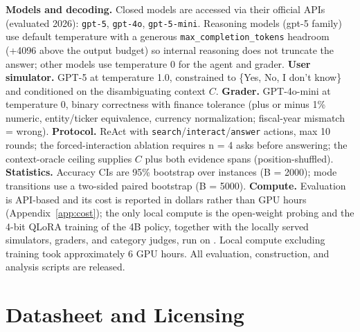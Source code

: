 \textbf{Models and decoding.} Closed models are accessed via their official APIs
(evaluated 2026): \texttt{gpt-5}, \texttt{gpt-4o}, \texttt{gpt-5-mini}. Reasoning
models (gpt-5 family) use default temperature with a generous
\texttt{max\_completion\_tokens} headroom (+4096 above the output budget) so
internal reasoning does not truncate the answer; other models use temperature
0 for the agent and grader. \textbf{User simulator.} GPT-5 at temperature 1.0,
constrained to \{Yes, No, I don't know\} and conditioned on the disambiguating
context $C$. \textbf{Grader.} GPT-4o-mini at temperature 0, binary correctness
with finance tolerance (plus or minus 1\% numeric, entity/ticker equivalence, currency
normalization; fiscal-year mismatch = wrong). \textbf{Protocol.} ReAct with
\texttt{search}/\texttt{interact}/\texttt{answer} actions, max 10 rounds; the
forced-interaction ablation requires n = 4 asks before answering; the
context-oracle ceiling supplies $C$ plus both evidence spans (position-shuffled).
\textbf{Statistics.} Accuracy CIs are 95\% bootstrap over instances (B = 2000);
mode transitions use a two-sided paired bootstrap (B = 5000).
\textbf{Compute.} Evaluation is API-based and its cost is reported in dollars rather than
GPU hours (Appendix~\ref{app:cost}); the only local compute is the open-weight probing and
the 4-bit QLoRA training of the 4B policy, together with the locally served simulators,
graders, and category judges, run on \GPUSPEC. Local compute excluding training took approximately 6 GPU hours. All evaluation,
construction, and analysis scripts are released.

\section{Datasheet and Licensing}
\label{app:datasheet}


